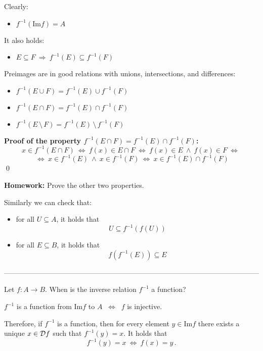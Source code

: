 \documentclass[11pt,paper=b5,footinclude,headinclude]{scrbook} %
\def\inn {{~\wedge~}}
\def\sledi {{~\Rightarrow~}}
\def\brez {{\,\setminus\,}}
\def\cee {{~\Leftrightarrow~}}
\theoremstyle{remark}
\theoremstyle{definition} %
\theoremstyle{theorem} %
\begin{document}
Clearly:
\begin{itemize}
  \item $f^{-1}(\textrm{Im}f) = A$
\end{itemize}

\bigskip
It also holds:
\begin{itemize}
  \item $E\subseteq F\sledi f^{-1}(E)\subseteq f^{-1}(F)$
\end{itemize}

\bigskip
Preimages are in good relations with unions, intersections, and differences:
\begin{itemize}
  \item $f^{-1}(E\cup F)= f^{-1}(E)\cup f^{-1}(F)$
  \item $f^{-1}(E\cap F)= f^{-1}(E)\cap f^{-1}(F)$
  \item $f^{-1}(E\brez F)= f^{-1}(E)\brez f^{-1}(F)$
\end{itemize}

\textbf{ Proof of the property $f^{-1}(E\cap F)= f^{-1}(E)\cap f^{-1}(F)$:}
$$x\in f^{-1}(E\cap F)\cee
f(x)\in E\cap F\cee
f(x)\in E \inn f(x)\in F\cee$$ $$\cee x\in f^{-1}(E) \inn x\in f^{-1}(F)
\cee x\in f^{-1}(E)\cap f^{-1}(F)$$
\qed

\textbf{ Homework:} Prove the other two properties.

\bigskip
Similarly we can check that:
\begin{itemize}
  \item for all  $U\subseteq A$, it holds that $$U\subseteq f^{-1}(f(U))$$
  \item for all $E\subseteq B$, it holds that $$f(f^{-1}(E))\subseteq E$$
\end{itemize}

\bigskip

------------------------------------------------------------------------------------------------------------

\bigskip

Let $f:A\to B$. When is the inverse relation $f^{-1}$ a function?

$f^{-1}$ is a function from $\textrm{Im}f$ to  $A$ $\cee$ $f$ is injective.



Therefore, if $f^{-1}$ is a function, then for every element
$y\in \textrm{Im}f$  there exists a unique $x\in {\cal D}f$ such that
$f^{-1}(y) = x$. It holds that
$$f^{-1}(y) = x\cee f(x) = y\,.$$
\end{document}
